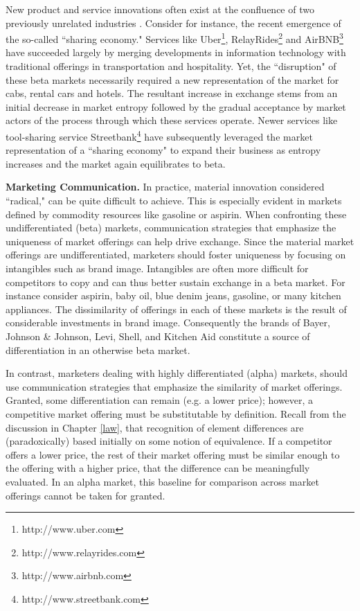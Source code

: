 New product and service innovations often exist at the confluence of two previously unrelated industries \citep{arthur2009}. Consider for instance, the recent emergence of the so-called ``sharing economy." Services like Uber\footnote{http://www.uber.com}, RelayRides\footnote{http://www.relayrides.com} and AirBNB\footnote{http://www.airbnb.com}  have succeeded largely by merging developments in information technology with traditional offerings in transportation and hospitality. Yet, the ``disruption" of these beta markets necessarily required a new representation of the market for cabs, rental cars and hotels. The resultant increase in exchange stems from an initial decrease in market entropy followed by the gradual acceptance by market actors of the process through which these services operate. Newer services like tool-sharing service Streetbank\footnote{http://www.streetbank.com} have subsequently leveraged the market representation of a ``sharing economy" to expand their business as entropy increases and the market again equilibrates to beta. 

\textbf{Marketing Communication.}
In practice, material innovation considered ``radical," can be quite difficult to achieve. This is especially evident in markets defined by commodity resources like gasoline or aspirin.  When confronting these undifferentiated (beta) markets, communication strategies that emphasize the uniqueness of market offerings can help drive exchange. Since the material market offerings are undifferentiated, marketers should foster uniqueness by focusing on intangibles such as brand image. Intangibles are often more difficult for competitors to copy \citep{teece1986} and can thus better sustain exchange in a beta market. For instance consider aspirin, baby oil, blue denim jeans, gasoline, or many kitchen appliances. The dissimilarity of offerings in each of these markets is the result of considerable investments in brand image. Consequently the brands of Bayer, Johnson \& Johnson, Levi, Shell, and Kitchen Aid constitute a source of differentiation in an otherwise beta market.  

In contrast, marketers dealing with highly differentiated (alpha) markets, should use communication strategies that emphasize the similarity of market offerings. Granted, some differentiation can remain (e.g. a lower price); however, a competitive market offering must be substitutable by definition. Recall from the discussion in Chapter \ref{law}, that recognition of element differences are (paradoxically) based initially on some notion of equivalence. If a competitor offers a lower price, the rest of their market offering must be similar enough to the offering with a higher price, that the difference can be meaningfully evaluated. In an alpha market, this baseline for comparison across market offerings cannot be taken for granted.


